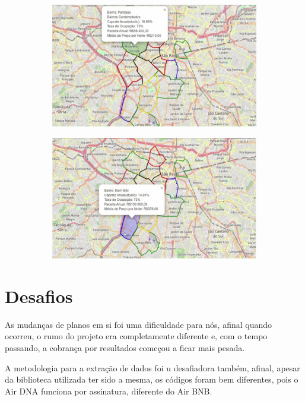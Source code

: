 \begin{figure}
\begin{subfigure}{0.49\linewidth}
        \includegraphics[width = \textwidth]{relatorios/lounge/imagens/3.jpg}
    \end{subfigure}
    \hfill
    \begin{subfigure}{0.49\linewidth}
        \includegraphics[width = \textwidth]{relatorios/lounge/imagens/4.jpg}
    \end{subfigure}

\end{figure}



\section*{Desafios}

As mudanças de planos em si foi uma dificuldade para nós, afinal quando
ocorreu, o rumo do projeto era completamente diferente e, com o tempo 
passando, a cobrança por resultados começou a ficar mais pesada.

A metodologia para a extração de dados foi u desafiadora também, afinal, 
apesar da biblioteca utilizada ter sido a mesma, os códigos foram bem diferentes, 
pois o Air DNA funciona por assinatura, diferente do Air BNB.

